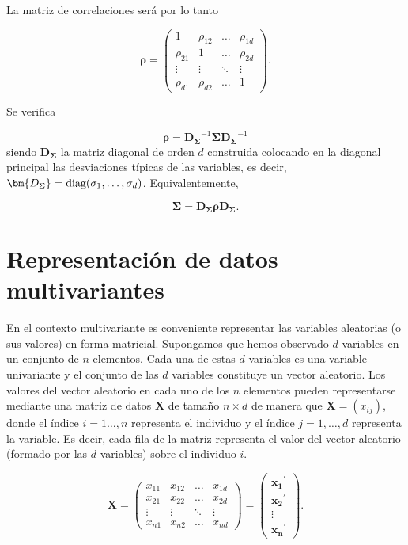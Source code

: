 \documentclass[
  a4paper,
  oneside]{scrbook}
\theoremstyle{definition}
\theoremstyle{definition}
\theoremstyle{definition}
\theoremstyle{definition}
\theoremstyle{remark}
\begin{document}
La matriz de correlaciones será por lo tanto

\[\bm\rho=\left(\begin{array}{cccc}1&\rho_{12}&\ldots&\rho_{1d}\\
\rho_{21}&1&\ldots&\rho_{2d}\\
\vdots&\vdots&\ddots&\vdots\\
\rho_{d1}&\rho_{d2}&\ldots&1\end{array}\right).\]

Se verifica

\[\bm\rho=\bm{D_\Sigma}^{-1}\bm{\Sigma}\bm{D_\Sigma}^{-1}\]
siendo
\(\bm{D_\Sigma}\) la matriz diagonal de orden \(d\) construida colocando en
la diagonal principal las desviaciones típicas de las variables, es
decir, \(\bm{D_\Sigma}=\textnormal{diag}(\sigma_1,\ldots,\sigma_d)\).
Equivalentemente,

\[\bm{\Sigma}=\bm{D_\Sigma}\bm\rho\bm{D_\Sigma}.\]

\section{Representación de datos multivariantes}\label{representacion-de-datos-multivariantes}

En el contexto multivariante es conveniente representar las variables
aleatorias (o sus valores) en forma matricial. Supongamos que hemos
observado \(d\) variables en un conjunto de \(n\) elementos. Cada una de
estas \(d\) variables es una variable univariante y el conjunto de las \(d\)
variables constituye un vector aleatorio. Los valores del vector
aleatorio en cada uno de los \(n\) elementos pueden representarse mediante
una matriz de datos \(\bm{X}\) de tamaño \(n\times d\) de manera que
\(\bm{X}=(x_{ij})\), donde el índice \(i=1\ldots,n\) representa el individuo
y el índice \(j =1,\ldots,d\) representa la variable. Es decir, cada fila
de la matriz representa el valor del vector aleatorio (formado por las \(d\) variables)
sobre el individuo \(i\).

\[\bm{X}=\left(\begin{array}{cccc}x_{11}&x_{12}&\ldots&x_{1d}\\
x_{21}&x_{22}&\ldots&x_{2d}\\
\vdots&\vdots&\ddots&\vdots\\
x_{n1}&x_{n2}&\ldots&x_{nd}\end{array}\right)=\left(\begin{array}{c}\bm{x_1}^\prime{}\\ \bm{x_2}^\prime{}\\ \vdots \\ \bm{x_n}^\prime{} \end{array}\right).\]
\end{document}
